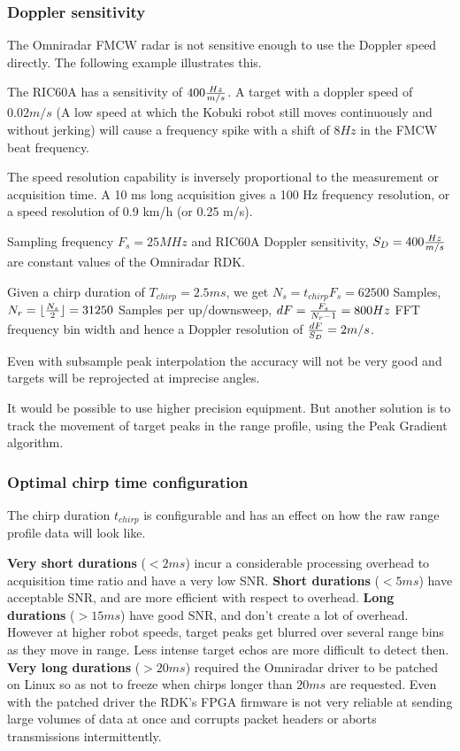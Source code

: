 \subsubsection{Doppler sensitivity}\label{doppler-sensitivity}

The Omniradar FMCW radar is not sensitive enough to use the Doppler
speed directly. The following example illustrates this.

The RIC60A has a sensitivity of \(400 {Hz\over{m/s}}\). A target with a
doppler speed of \(0.02 m/s\) (A low speed at which the Kobuki robot
still moves continuously and without jerking) will cause a frequency
spike with a shift of \(8Hz\) in the FMCW beat frequency.

The speed resolution capability is inversely proportional to the
measurement or acquisition time. A 10 ms long acquisition gives a 100 Hz
frequency resolution, or a speed resolution of 0.9 km/h (or 0.25 m/s).

Sampling frequency \(F_s=25MHz\) and RIC60A Doppler sensitivity,
\(S_D = 400 {Hz\over{m/s}}\) are constant values of the Omniradar RDK.

Given a chirp duration of \(T_{chirp} = 2.5ms\), we get
\(N_s = t_{chirp} F_s = 62500\) Samples,
\(N_r = \lfloor {N_s \over{2} }\rfloor = 31250\) Samples per
up/downsweep, \(dF = {F_s \over{N_r - 1}} = 800 Hz\) FFT frequency bin
width and hence a Doppler resolution of \({dF \over{S_D}} = 2 m/s\).

Even with subsample peak interpolation the accuracy will not be very
good and targets will be reprojected at imprecise angles.

It would be possible to use higher precision equipment. But another
solution is to track the movement of target peaks in the range profile,
using the Peak Gradient algorithm.

\subsubsection{Optimal chirp time
configuration}\label{optimal-chirp-time-configuration}

The chirp duration \(t_{chirp}\) is configurable and has an effect on
how the raw range profile data will look like.

\textbf{Very short durations} (\(<2ms\)) incur a considerable processing
overhead to acquisition time ratio and have a very low SNR.
\textbf{Short durations} (\(<5ms\)) have acceptable SNR, and are more
efficient with respect to overhead. \textbf{Long durations} (\(>15ms\))
have good SNR, and don't create a lot of overhead. However at higher
robot speeds, target peaks get blurred over several range bins as they
move in range. Less intense target echos are more difficult to detect
then. \textbf{Very long durations} (\(>20ms\)) required the Omniradar
driver to be patched on Linux so as not to freeze when chirps longer
than \(20ms\) are requested. Even with the patched driver the RDK's FPGA
firmware is not very reliable at sending large volumes of data at once
and corrupts packet headers or aborts transmissions intermittently.

